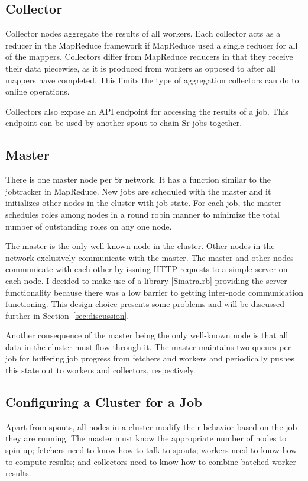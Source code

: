 \documentclass[12pt]{article}
\begin{document}
\subsection{Collector}
Collector nodes aggregate the results of all workers. Each collector acts as a reducer in the MapReduce framework if MapReduce used a single reducer for all of the mappers. Collectors differ from MapReduce reducers in that they receive their data piecewise, as it is produced from workers as opposed to after all mappers have completed. This limits the type of aggregation collectors can do to online operations.

Collectors also expose an API endpoint for accessing the results of a job. This endpoint can be used by another spout to chain Sr jobs together.
\subsection{Master}
There is one master node per Sr network. It has a function similar to the jobtracker in MapReduce. New jobs are scheduled with the master and it initializes other nodes in the cluster with job state. For each job, the master schedules roles among nodes in a round robin manner to minimize the total number of outstanding roles on any one node.

The master is the only well-known node in the cluster. Other nodes in the network exclusively communicate with the master. The master and other nodes communicate with each other by issuing HTTP requests to a simple server on each node. I decided to make use of a library [Sinatra.rb] providing the server functionality because there was a low barrier to getting inter-node communication functioning. This design choice presents some problems and will be discussed further in Section~\ref{sec:discussion}.

Another consequence of the master being the only well-known node is that all data in the cluster must flow through it. The master maintains two queues per job for buffering job progress from fetchers and workers and periodically pushes this state out to workers and collectors, respectively.
\subsection{Configuring a Cluster for a Job}
Apart from spouts, all nodes in a cluster modify their behavior based on the job they are running. The master must know the appropriate number of nodes to spin up; fetchers need to know how to talk to spouts; workers need to know how to compute results; and collectors need to know how to combine batched worker results.
\end{document}
